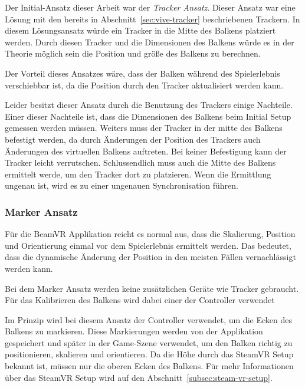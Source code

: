 Der Initial-Ansatz dieser Arbeit war der \emph{Tracker Ansatz}.
Dieser Ansatz war eine Lösung mit den bereits in Abschnitt~\ref{sec:vive-tracker} beschriebenen Trackern.
In diesem Lösungsansatz würde ein Tracker in die Mitte des Balkens platziert werden.
Durch diesen Tracker und die Dimensionen des Balkens würde es in der Theorie möglich sein die Position und größe des Balkens zu berechnen.

Der Vorteil dieses Ansatzes wäre, dass der Balken während des Spielerlebnis verschiebbar ist, da die Position durch den Tracker aktualisiert werden kann.

Leider besitzt dieser Ansatz durch die Benutzung des Trackers einige Nachteile.
Einer dieser Nachteile ist, dass die Dimensionen des Balkens beim Initial Setup gemessen werden müssen.
Weiters muss der Tracker in der mitte des Balkens befestigt werden, da durch Änderungen der Position des Trackers auch Änderungen des virtuellen Balkens auftreten.
Bei keiner Befestigung kann der Tracker leicht verrutschen.
Schlussendlich muss auch die Mitte des Balkens ermittelt werde, um den Tracker dort zu platzieren.
Wenn die Ermittlung ungenau ist, wird es zu einer ungenauen Synchronisation führen.

\subsubsection{Marker Ansatz}

Für die BeamVR Applikation reicht es normal aus, dass die Skalierung, Position und Orientierung einmal vor dem Spielerlebnis ermittelt werden.
Das bedeutet, dass die dynamische Änderung der Position in den meisten Fällen vernachlässigt werden kann.

Bei dem Marker Ansatz werden keine zusätzlichen Geräte wie Tracker gebraucht.
Für das Kalibrieren des Balkens wird dabei einer der Controller verwendet

Im Prinzip wird bei diesem Ansatz der Controller verwendet, um die Ecken des Balkens zu markieren.
Diese Markierungen werden von der Applikation gespeichert und später in der Game-Szene verwendet, um den Balken richtig zu positionieren, skalieren und orientieren.
Da die Höhe durch das SteamVR Setup bekannt ist, müssen nur die oberen Ecken des Balkens.
Für mehr Informationen über das SteamVR Setup wird auf den Abschnitt~\ref{subsec:steam-vr-setup}.

